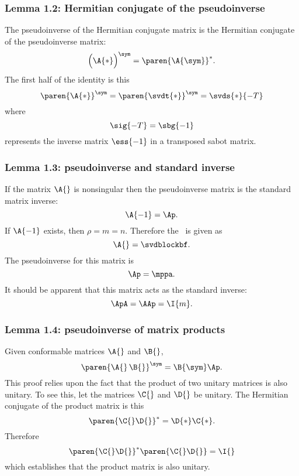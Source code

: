 \subsubsection{Lemma 1.2: Hermitian conjugate of the pseudoinverse}
The pseudoinverse of the Hermitian conjugate matrix is the Hermitian conjugate of the pseudoinverse matrix:
\begin{equation}
  \Bigl(\A{*}\Bigr)^{\sym} = \paren{\A{\sym}}^{*}.
\end{equation}
The first half of the identity is this
\begin{equation}
  \paren{\A{*}}^{\sym} = \paren{\svdt{*}}^{\sym} = \svds{*}{-T}
\end{equation}
where
\begin{equation}
  \sig{-T} = \sbg{-1}
\end{equation}
represents the inverse matrix $\ess{-1}$ in a transposed sabot matrix.

\subsubsection{Lemma 1.3: pseudoinverse and standard inverse}
If the matrix $\A{}$ is nonsingular then the pseudoinverse matrix is the standard matrix inverse:
\begin{equation}
  \A{-1} = \Ap.
\end{equation}
If $\A{-1}$ exists, then $\rho = m = n$. Therefore the \asvd \ is given as
\begin{equation}
  \A{} = \svdblockbf.
\end{equation}
The pseudoinverse for this matrix is
\begin{equation}
  \Ap = \mppa.
\end{equation}
It should be apparent that this matrix acts as the standard inverse:
\begin{equation}
  \ApA = \AAp = \I{m}.
\end{equation}


\subsubsection{Lemma 1.4: pseudoinverse of matrix products}
Given conformable matrices $\A{}$ and $\B{}$,
\begin{equation}
  \paren{\A{}\,\B{}}^{\sym} = \B{\sym}\Ap.
\end{equation}
This proof relies upon the fact that the product of two unitary matrices is also unitary. To see this, let the matrices $\C{}$ and $\D{}$ be unitary. The Hermitian conjugate of the product matrix is this
\begin{equation}
  \paren{ \C{}\D{} }^{*} = \D{*}\C{*}.
\end{equation}
Therefore
\begin{equation}
  \paren{ \C{}\D{} }^{*} \paren{\C{}\D{}}  = \I{}
\end{equation}
which establishes that the product matrix is also unitary.


